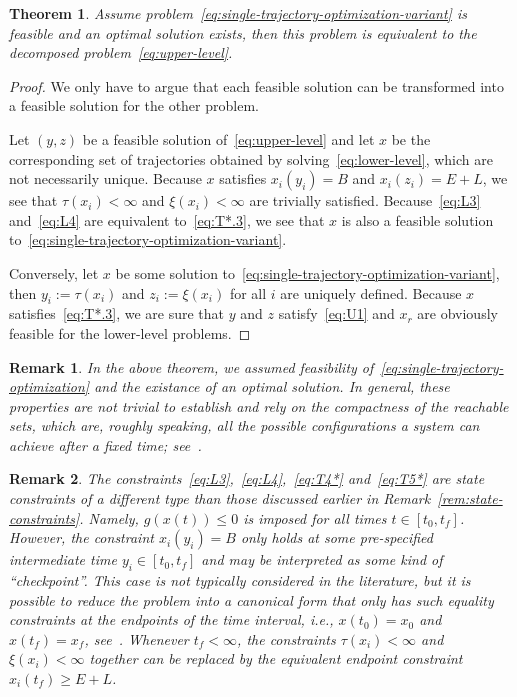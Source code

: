 \documentclass[a4paper]{report}
\theoremstyle{definition}
\theoremstyle{plain}
\newtheorem{theorem}{Theorem}[chapter]
\newtheorem{remark}{Remark}[chapter]
\begin{document}
\begin{theorem}
  Assume problem~\eqref{eq:single-trajectory-optimization-variant} is feasible and an optimal solution exists, then this
  problem is equivalent to the decomposed problem~\eqref{eq:upper-level}.
\end{theorem}
\begin{proof}
  We only have to argue that each feasible solution can be transformed into a
  feasible solution for the other problem.

  Let $(y,z)$ be a feasible solution of~\eqref{eq:upper-level} and let $x$ be
  the corresponding set of trajectories obtained by
  solving~\eqref{eq:lower-level}, which are not necessarily unique. Because $x$
  satisfies $x_{i}(y_{i}) = B$ and $x_{i}(z_{i}) = E + L$, we see that
  $\tau(x_{i}) < \infty$ and $\xi(x_{i}) < \infty$ are trivially satisfied.
  Because~\eqref{eq:L3} and~\eqref{eq:L4} are equivalent to~\eqref{eq:T*.3}, we
  see that $x$ is also a feasible solution
  to~\eqref{eq:single-trajectory-optimization-variant}.

  Conversely, let $x$ be some solution
  to~\eqref{eq:single-trajectory-optimization-variant}, then
  $y_{i} := \tau(x_{i})$ and $z_{i} := \xi(x_{i})$ for all $i$ are uniquely
  defined. Because $x$ satisfies~\eqref{eq:T*.3}, we are sure that $y$ and $z$
  satisfy~\eqref{eq:U1} and $x_{r}$ are obviously feasible for the lower-level
  problems.
\end{proof}

\begin{remark}
  In the above theorem, we assumed feasibility of~\eqref{eq:single-trajectory-optimization} and the existance of an optimal solution.
  In general, these properties are not trivial to establish and rely on the
  compactness of the reachable sets, which are, roughly speaking, all the
  possible configurations a system can achieve after a fixed time;
  see~\cite[Section 4.5]{liberzonCalculusVariationsOptimal}.
\end{remark}


\begin{remark}
  The constraints~\eqref{eq:L3},~\eqref{eq:L4},~\eqref{eq:T4*}
  and~\eqref{eq:T5*} are state constraints of a different type than those
  discussed earlier in Remark~\ref{rem:state-constraints}. Namely,
  $g(x(t)) \leq 0$ is imposed for all times $t \in [t_{0}, t_{f}]$.
  However, the constraint $x_{i}(y_{i}) = B$ only holds at some pre-specified
  intermediate time $y_{i} \in [t_{0}, t_{f}]$ and may be interpreted as some
  kind of ``checkpoint''.
  This case is not typically considered in the literature, but it is
  possible to reduce the problem into a canonical form that only has such
  equality constraints at the endpoints of the time interval, i.e.,
  $x(t_{0}) = x_{0}$ and $x(t_{f}) = x_{f}$,
  see~\cite{dmitrukMaximumPrincipleOptimal2011}.
  Whenever $t_{f} < \infty$, the constraints $\tau(x_{i}) < \infty$ and
  $\xi(x_{i}) < \infty$ together can be replaced by the equivalent endpoint
  constraint $x_{i}(t_{f}) \geq E + L$.
\end{remark}
\end{document}
